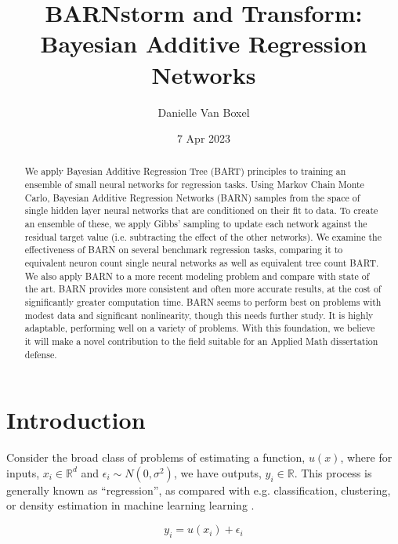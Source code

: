 \documentclass[12pt]{article}
\title{BARNstorm and Transform: Bayesian Additive Regression Networks}
\author{Danielle Van Boxel}
\date{7 Apr 2023}
\begin{document}
\maketitle

\begin{abstract}

    We apply Bayesian Additive Regression Tree (BART) principles to training an ensemble of small neural networks for regression tasks.  Using Markov Chain Monte Carlo, Bayesian Additive Regression Networks (BARN) samples from the space of single hidden layer neural networks that are conditioned on their fit to data.  To create an ensemble of these, we apply Gibbs' sampling to update each network against the residual target value (i.e. subtracting the effect of the other networks).  We examine the effectiveness of BARN on several benchmark regression tasks, comparing it to equivalent neuron count single neural networks as well as equivalent tree count BART.  We also apply BARN to a more recent modeling problem and compare with state of the art.  BARN provides more consistent and often more accurate results, at the cost of significantly greater computation time.  BARN seems to perform best on problems with modest data and significant nonlinearity, though this needs further study.  It is highly adaptable, performing well on a variety of problems.  With this foundation, we believe it will make a novel contribution to the field suitable for an Applied Math dissertation defense.
\end{abstract}

\section{Introduction}\label{sec:intro}


Consider the broad class of problems of estimating a function, $u(x)$, where for inputs, $x_i \in \mathbb{R}^d$ and $\epsilon_i \sim N(0,\sigma^2)$, we have outputs, $y_i \in \mathbb{R}$.  This process is generally known as ``regression'', as compared with e.g. classification, clustering, or density estimation in machine learning learning \cite{hastie2009elements}.

$$
y_i = u(x_i) + \epsilon_i
$$
\end{document}
